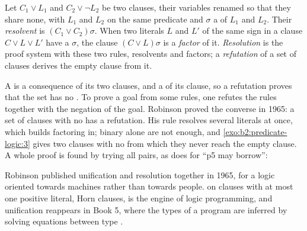 \begin{definition}\label{def:b2:predicate-logic:resolution}
Let $C_1 \vee L_1$ and $C_2 \vee \neg L_2$ be two clauses, their variables renamed so that they share none, with $L_1$
and $L_2$  on the same predicate and $\sigma$ a  of $L_1$ and $L_2$. Their
\emph{resolvent} is $(C_1 \vee C_2)\sigma$. When two literals $L$ and $L'$ of the same sign in a clause
$C \vee L \vee L'$ have a  $\sigma$, the clause $(C \vee L)\sigma$ is a \emph{factor} of it.
\emph{Resolution} is the proof system with these two rules, resolvents and factors;
a \emph{refutation} of a set of clauses derives the empty clause from it.
\end{definition}


A  is a consequence of its two clauses, and a  of its clause, so a refutation proves that the set has no . To prove a goal from
some rules, one refutes the rules together with the negation of the goal. Robinson proved the converse in 1965: a set
of clauses with no  has a refutation. His rule resolves several literals at once, which builds factoring in;
binary  alone are not enough, and \cref{exo:b2:predicate-logic:3} gives two clauses with no  from
which they never reach the empty clause. A whole proof is found by trying all pairs, as  does for ``p5
may borrow'':

\label{out:b2:predicate-logic:refute}

Robinson published unification and resolution together in 1965, for a logic oriented towards machines rather than
towards people.  on clauses with at most one positive literal, Horn clauses, is the engine of logic
programming, and unification reappears in Book 5, where the types of a program are inferred by solving equations
between type .

